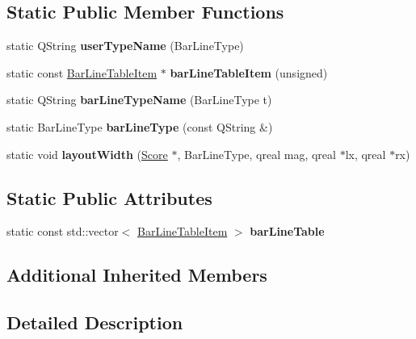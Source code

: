 \subsection*{Static Public Member Functions}
\begin{DoxyCompactItemize}
\item 
\mbox{\label{class_ms_1_1_bar_line_af6752231f69ebd62d2dd3d776db831ab}} 
static Q\+String {\bfseries user\+Type\+Name} (Bar\+Line\+Type)
\item 
\mbox{\label{class_ms_1_1_bar_line_a0bbab2d44d0d1d2db12fc0b6363e84c9}} 
static const \hyperlink{struct_ms_1_1_bar_line_table_item}{Bar\+Line\+Table\+Item} $\ast$ {\bfseries bar\+Line\+Table\+Item} (unsigned)
\item 
\mbox{\label{class_ms_1_1_bar_line_ae6763369524fa25d169fdf7f762f490b}} 
static Q\+String {\bfseries bar\+Line\+Type\+Name} (Bar\+Line\+Type t)
\item 
\mbox{\label{class_ms_1_1_bar_line_ac4678e2a2f25095286be031a7ffa6c22}} 
static Bar\+Line\+Type {\bfseries bar\+Line\+Type} (const Q\+String \&)
\item 
\mbox{\label{class_ms_1_1_bar_line_a00d34b127add6d956de395187e188d2a}} 
static void {\bfseries layout\+Width} (\hyperlink{class_ms_1_1_score}{Score} $\ast$, Bar\+Line\+Type, qreal mag, qreal $\ast$lx, qreal $\ast$rx)
\end{DoxyCompactItemize}
\subsection*{Static Public Attributes}
\begin{DoxyCompactItemize}
\item 
static const std\+::vector$<$ \hyperlink{struct_ms_1_1_bar_line_table_item}{Bar\+Line\+Table\+Item} $>$ {\bfseries bar\+Line\+Table}
\end{DoxyCompactItemize}
\subsection*{Additional Inherited Members}


\subsection{Detailed Description}


